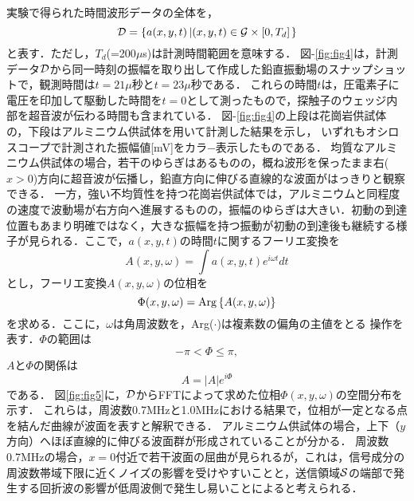 ﻿%
実験で得られた時間波形データの全体を，
\begin{equation}
	{\cal D}=\left\{
		a(x,y,t)\left| (x,y,t)\in {\cal G}\times [0,T_d] \right.
	\right\}
	\label{eqn:dataset}
\end{equation}
と表す．ただし，$T_d$(=200$\mu$s)は計測時間範囲を意味する．
図-\ref{fig:fig4}は，計測データ$\cal D$から同一時刻の振幅を取り出して作成した鉛直振動場のスナップショットで，観測時間は$t=21\mu$秒と$t=23\mu$秒である．
これらの時間$t$は，圧電素子に電圧を印加して駆動した時間を$t=0$として測ったもので，探触子のウェッジ内部を超音波が伝わる時間も含まれている．
図-\ref{fig:fig4}の上段は花崗岩供試体の，下段はアルミニウム供試体を用いて計測した結果を示し，
いずれもオシロスコープで計測された振幅値[mV]をカラ−表示したものである．
均質なアルミニウム供試体の場合，若干のゆらぎはあるものの，概ね波形を保ったまま右($x>0$)方向に超音波が伝播し，鉛直方向に伸びる直線的な波面がはっきりと観察できる．
一方，強い不均質性を持つ花崗岩供試体では，アルミニウムと同程度の速度で波動場が右方向へ進展するものの，振幅のゆらぎは大きい．初動の到達位置もあまり明確ではなく，大きな振幅を持つ振動が初動の到達後も継続する様子が見られる．ここで，$a(x,y,t)$の時間$t$に関するフーリエ変換を
\begin{equation}
	A(x,y,\omega)=\int a(x,y,t)e^{i\omega t} dt
	\label{eqn:Fourier_t}
\end{equation}
とし，フーリエ変換$A(x,y,\omega)$の位相を
\begin{equation}
	\Phi(x,y,\omega)={\rm Arg}\left\{ A(x,y,\omega) \right\}
	\label{eqn:def_Phi}
\end{equation}
を求める．ここに，$\omega$は角周波数を，Arg($\cdot$)は複素数の偏角の主値をとる
操作を表す．$\Phi$の範囲は
\begin{equation}
	-\pi < \Phi \leq \pi, 
	\label{eqn:dom_phi}
\end{equation}
$A$と$\Phi$の関係は
\begin{equation}
	A=\left| A \right|e^{i\Phi}
	\label{eqn:phi2A}
\end{equation}
である．
図\ref{fig:fig5}に，$\cal D$からFFTによって求めた位相$\Phi(x,y,\omega)$の空間分布を示す．
これらは，周波数0.7MHzと1.0MHzにおける結果で，位相が一定となる点を結んだ曲線が波面を表すと解釈できる．
アルミニウム供試体の場合，上下（$y$方向）へほぼ直線的に伸びる波面群が形成されていることが分かる．
周波数0.7MHzの場合，$x=0$付近で若干波面の屈曲が見られるが，これは，信号成分の周波数帯域下限に近くノイズの影響を受けやすいことと，送信領域$\cal S$の端部で発生する回折波の影響が低周波側で発生し易いことによると考えられる．
